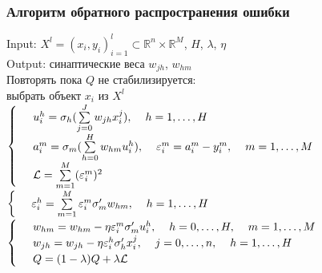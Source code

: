 \documentclass[12pt]{beamer}
\begin{document}
\begin{frame}\frametitle{Алгоритм обратного распространения ошибки}
Input: $X^l = (x_i, y_i)_{i=1}^l \subset \mathbb{R}^n \times \mathbb{R}^M$, $H$, $\lambda$, $\eta$\\
Output: синаптические веса $w_{jh}$, $w_{hm}$\\
Повторять пока $Q$ не стабилизируется:\\
\hspace{5mm} выбрать объект $x_i$ из $X^l$\\
$\begin{cases}
\hspace{5mm} u^h_i = \sigma_h (\sum\limits_{j=0}^J w_{jh} x_i^j), \hspace{4mm} h = 1, \dots, H\\
\hspace{5mm} a^m_i = \sigma_m (\sum\limits_{h=0}^H w_{hm} u_i^h), \hspace{4mm} \varepsilon_i^m = a_i^m - y_i^m, \hspace{4mm} m = 1, \dots, M\\
\hspace{5mm} \mathcal{L} = \sum\limits_{m=1}^M (\varepsilon_i^m)^2\\
\end{cases}$\\
$\begin{cases} \hspace{5mm} \varepsilon_i^h = \sum\limits_{m=1}^M \varepsilon_i^m \sigma'_m w_{hm}, \hspace{4mm} h = 1, \dots, H\end{cases}$\\
$\begin{cases} \hspace{5mm} w_{hm} = w_{hm} - \eta \varepsilon_i^m \sigma'_m u_i^h, \hspace{4mm} h = 0, \dots, H, \hspace{4mm} m = 1, \dots, M\\
\hspace{5mm} w_{jh} = w_{jh} - \eta \varepsilon_i^h \sigma'_h x_i^j, \hspace{4mm} j = 0, \dots, n, \hspace{4mm} h = 1, \dots, H\\
\hspace{5mm} Q = (1 - \lambda)Q + \lambda \mathcal{L}\end{cases}$\\
\end{frame}
\end{document}
